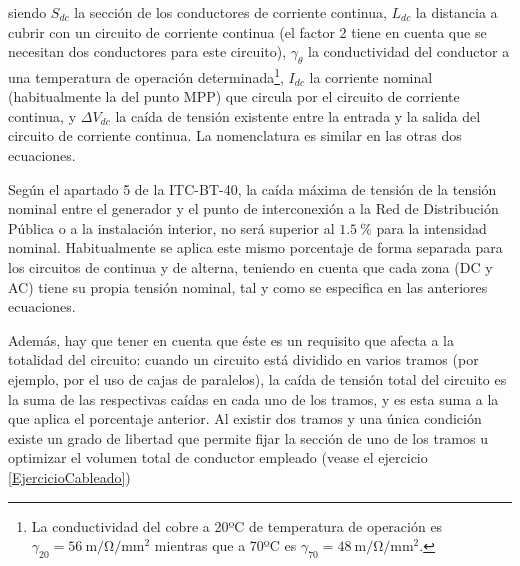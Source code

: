 siendo $S_{dc}$ la sección de los conductores de corriente continua,
$L_{dc}$ la distancia a cubrir con un circuito de corriente continua
(el factor 2 tiene en cuenta que se necesitan dos conductores para
este circuito), $\gamma_\theta$ la conductividad del conductor a una temperatura
de operación determinada\footnote{La conductividad del cobre a 20ºC de
  temperatura de operación es $\gamma_{20} =\SI{56}{\meter\per\ohm\per\milli\meter\squared}$ mientras que a 70ºC es
$\gamma_{70} = \SI{48}{\meter\per\ohm\per\milli\meter\squared}$.},
$I_{dc}$ la corriente nominal (habitualmente la del punto MPP) que
circula por el circuito de corriente continua, y $\Delta V_{dc}$ la
caída de tensión existente entre la entrada y la salida del circuito
de corriente continua. La nomenclatura es similar en las otras dos
ecuaciones.


Según el apartado 5 de la ITC-BT-40, la caída máxima de tensión de la
tensión nominal entre el generador y el punto de interconexión a la
Red de Distribución Pública o a la instalación interior, no será
superior al $\SI{1.5}{\percent}$ para la intensidad nominal.
Habitualmente se aplica este mismo porcentaje de forma separada para
los circuitos de continua y de alterna, teniendo en cuenta que cada
zona (DC y AC) tiene su propia tensión nominal, tal y como se
especifica en las anteriores ecuaciones.

Además, hay que tener en cuenta que éste es un requisito que afecta a la
totalidad del circuito: cuando un circuito está dividido en varios
tramos (por ejemplo, por el uso de cajas de paralelos), la caída de
tensión total del circuito es la suma de las respectivas caídas en cada uno de los
tramos, y es esta suma a la que aplica el porcentaje anterior. Al
existir dos tramos y una única condición existe un grado de libertad
que permite fijar la sección de uno de los tramos u optimizar el
volumen total de conductor empleado (vease el ejercicio
\ref{EjercicioCableado})

